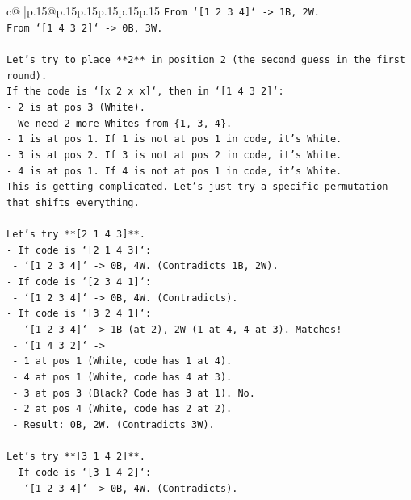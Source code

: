 \documentclass{article}
\begin{document}
{\begin{supertabular}{c@{$\;$}|p{.15\linewidth}@{}p{.15\linewidth}p{.15\linewidth}p{.15\linewidth}p{.15\linewidth}p{.15\linewidth}}
{{{\texttt{From `{[}1 2 3 4{]}` {-}> 1B, 2W.} \\
\texttt{From `{[}1 4 3 2{]}` {-}> 0B, 3W.} \\
\\ 
\texttt{Let's try to place **2** in position 2 (the second guess in the first round).} \\
\texttt{If the code is `{[}x 2 x x{]}`, then in `{[}1 4 3 2{]}`:} \\
\texttt{{-} 2 is at pos 3 (White).} \\
\texttt{{-} We need 2 more Whites from \{1, 3, 4\}.} \\
\texttt{{-} 1 is at pos 1. If 1 is not at pos 1 in code, it's White.} \\
\texttt{{-} 3 is at pos 2. If 3 is not at pos 2 in code, it's White.} \\
\texttt{{-} 4 is at pos 1. If 4 is not at pos 1 in code, it's White.} \\
\texttt{This is getting complicated. Let's just try a specific permutation that shifts everything.} \\
\\ 
\texttt{Let's try **{[}2 1 4 3{]}**.} \\
\texttt{{-} If code is `{[}2 1 4 3{]}`:} \\
\texttt{  {-} `{[}1 2 3 4{]}` {-}> 0B, 4W. (Contradicts 1B, 2W).} \\
\texttt{{-} If code is `{[}2 3 4 1{]}`:} \\
\texttt{  {-} `{[}1 2 3 4{]}` {-}> 0B, 4W. (Contradicts).} \\
\texttt{{-} If code is `{[}3 2 4 1{]}`:} \\
\texttt{  {-} `{[}1 2 3 4{]}` {-}> 1B (at 2), 2W (1 at 4, 4 at 3). Matches!} \\
\texttt{  {-} `{[}1 4 3 2{]}` {-}>} \\
\texttt{    {-} 1 at pos 1 (White, code has 1 at 4).} \\
\texttt{    {-} 4 at pos 1 (White, code has 4 at 3).} \\
\texttt{    {-} 3 at pos 3 (Black? Code has 3 at 1). No.} \\
\texttt{    {-} 2 at pos 4 (White, code has 2 at 2).} \\
\texttt{    {-} Result: 0B, 2W. (Contradicts 3W).} \\
\\ 
\texttt{Let's try **{[}3 1 4 2{]}**.} \\
\texttt{{-} If code is `{[}3 1 4 2{]}`:} \\
\texttt{  {-} `{[}1 2 3 4{]}` {-}> 0B, 4W. (Contradicts).} \\
}}}
\end{supertabular}}
\end{document}
